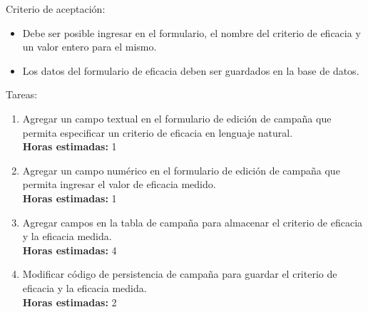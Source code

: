 \documentclass[a4paper, 10pt, twoside]{article}
\newenvironment{stories}{
  \begin{itemize}
}{
  \end{itemize}
}
\newenvironment{tasks}{
  Tareas:
  \begin{enumerate}
}{
  \end{enumerate}
}
\newcommand{\task}[1] {
  \item #1.\\
  \textbf{Horas estimadas:}
}
\newenvironment{criterios}{
  Criterio de aceptación:
  \begin{itemize}
}{
  \end{itemize}
}
\newcommand{\criteria}[1] {
  \item #1
}
\begin{document}
\begin{stories}
   \begin{criterios}
    \criteria{Debe ser posible ingresar en el formulario, el nombre del criterio de eficacia y un valor entero para el mismo.}
    \criteria{Los datos del formulario de eficacia deben ser guardados en la base de datos.}
  \end{criterios} 

  \begin{tasks}
    \task{Agregar un campo textual en el formulario de edición de campaña que permita especificar un criterio de eficacia en lenguaje natural} 1
    \task{Agregar un campo numérico en el formulario de edición de campaña que permita ingresar el valor de eficacia medido} 1
    \task{Agregar campos en la tabla de campaña para almacenar el criterio de eficacia y la eficacia medida} 4
    \task{Modificar código de persistencia de campaña para guardar el criterio de eficacia y la eficacia medida} 2
  \end{tasks}
\end{stories}
\end{document}
